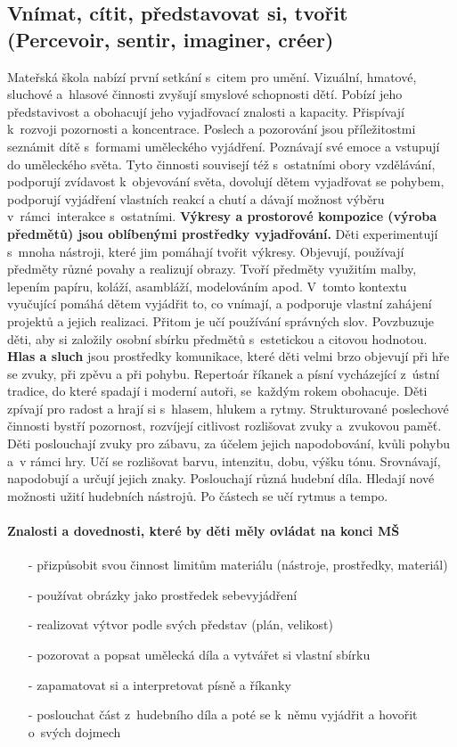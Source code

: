 		\subsection{Vnímat, cítit, představovat si, tvořit (Percevoir, sentir, imaginer, créer)}
			Mateřská škola nabízí první setkání s citem pro umění. Vizuální, hmatové, sluchové a hlasové činnosti zvyšují smyslové schopnosti dětí. Pobízí jeho představivost a obohacují jeho vyjadřovací znalosti a kapacity. Přispívají k rozvoji pozornosti a koncentrace. Poslech a pozorování jsou příležitostmi seznámit dítě s formami uměleckého vyjádření. Poznávají své emoce a vstupují do uměleckého světa.
			Tyto činnosti souvisejí též s ostatními obory vzdělávání, podporují zvídavost k objevování světa, dovolují dětem vyjadřovat se pohybem, podporují vyjádření vlastních reakcí a chutí a dávají možnost výběru v~rámci interakce s ostatními.
			\textbf{Výkresy a prostorové kompozice (výroba předmětů) jsou oblíbenými prostředky vyjadřování.}
			Děti experimentují s mnoha nástroji, které jim pomáhají tvořit výkresy. Objevují, používají předměty různé povahy a realizují obrazy. Tvoří předměty využitím malby, lepením papíru, koláží, asambláží, modelováním apod.
			V tomto kontextu vyučující pomáhá dětem vyjádřit to, co vnímají, a podporuje vlastní zahájení projektů a jejich realizaci. Přitom je učí používání správných slov. Povzbuzuje děti, aby si založily osobní sbírku předmětů s estetickou a citovou hodnotou.
			\textbf{Hlas a sluch} jsou prostředky komunikace, které děti velmi brzo objevují při hře se zvuky, při zpěvu a při pohybu.
			Repertoár říkanek a písní vycházející z ústní tradice, do které spadají i moderní autoři, se každým rokem obohacuje. Děti zpívají pro radost a hrají si s hlasem, hlukem a rytmy.
			Strukturované poslechové činnosti bystří pozornost, rozvíjejí citlivost rozlišovat zvuky a zvukovou paměť. Děti poslouchají zvuky pro zábavu, za účelem jejich napodobování, kvůli pohybu a v rámci hry. Učí se rozlišovat barvu, intenzitu, dobu, výšku tónu. Srovnávají, napodobují a určují jejich znaky. Poslouchají různá hudební díla. Hledají nové možnosti užití hudebních nástrojů. Po částech se učí rytmus a tempo. 

			\paragraph{Znalosti a dovednosti, které by děti měly ovládat na konci MŠ}
				\begin{itemize}
					\setlength\itemsep{-2mm}
					\item[-] přizpůsobit svou činnost limitům materiálu (nástroje, prostředky, materiál)
					\item[-] používat obrázky jako prostředek sebevyjádření
					\item[-] realizovat výtvor podle svých představ (plán, velikost)
					\item[-] pozorovat a popsat umělecká díla a vytvářet si vlastní sbírku
					\item[-] zapamatovat si a interpretovat písně a říkanky
					\item[-] poslouchat část z hudebního díla a poté se k němu vyjádřit a hovořit o~svých dojmech
				\end{itemize}



